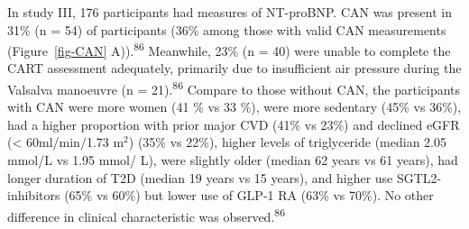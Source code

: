 \documentclass[
  letterpaper,
  headsepline=true,
  open=any]{scrbook}
\begin{document}
In study III, 176 participants had measures of NT-proBNP. CAN was
present in 31\% (n = 54) of participants (36\% among those with valid
CAN measurements (Figure~\ref{fig-CAN} A)).\textsuperscript{86}
Meanwhile, 23\% (n = 40) were unable to complete the CART assessment
adequately, primarily due to insufficient air pressure during the
Valsalva manoeuvre (n = 21).\textsuperscript{86} Compare to those
without CAN, the participants with CAN were more women (41 \% vs 33 \%),
were more sedentary (45\% vs 36\%), had a higher proportion with prior
major CVD (41\% vs 23\%) and declined eGFR (\textless{} 60ml/min/1.73
m\(^2\)) (35\% vs 22\%), higher levels of triglyceride (median 2.05
mmol/L vs 1.95 mmol/ L), were slightly older (median 62 years vs 61
years), had longer duration of T2D (median 19 years vs 15 years), and
higher use SGTL2-inhibitors (65\% vs 60\%) but lower use of GLP-1 RA
(63\% vs 70\%). No other difference in clinical characteristic was
observed.\textsuperscript{86}

\end{document}
